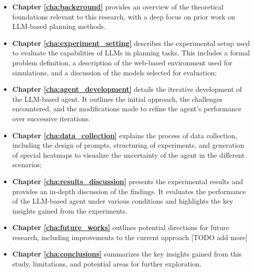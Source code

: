 \begin{itemize}
  \item \textbf{Chapter \ref{cha:background}} provides an overview of the
    theoretical foundations relevant to this research, with a deep focus on prior
    work on LLM-based planning methods.

  \item \textbf{Chapter \ref{cha:experiment_setting}} describes the experimental
    setup used to evaluate the capabilities of LLMs in planning tasks. This includes
    a formal problem definition, a description of the web-based environment used
    for simulations, and a discussion of the models selected for evaluation;

  \item \textbf{Chapter \ref{cha:agent_development}} details the iterative
    development of the LLM-based agent. It outlines the initial approach, the
    challenges encountered, and the modifications made to refine the agent's performance
    over successive iterations.

  \item \textbf{Chapter \ref{cha:data_collection}} explains the process of data
    collection, including the design of prompts, structuring of experiments, and
    generation of special heatmaps to visualize the uncertainty of the agent in the
    different scenarios;

  \item \textbf{Chapter \ref{cha:results_discussion}} presents the experimental
    results and provides an in-depth discussion of the findings. It evaluates the
    performance of the LLM-based agent under various conditions and highlights the
    key insights gained from the experiments.

  \item \textbf{Chapter \ref{cha:future_works}} outlines potential directions
    for future research, including improvements to the current approach [TODO
    add more]

  \item \textbf{Chapter \ref{cha:conclusions}} summarizes the key insights
    gained from this study, limitations, and potential areas for further
    exploration.
\end{itemize}